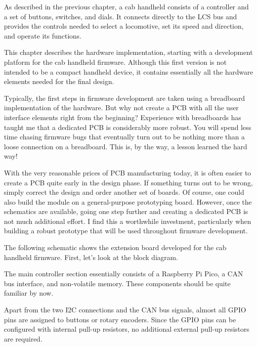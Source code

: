 
As described in the previous chapter, a cab handheld consists of a controller and a set of buttons, switches, and dials. It connects directly to the LCS bus and provides the controls needed to select a locomotive, set its speed and direction, and operate its functions.

This chapter describes the hardware implementation, starting with a development platform for the cab handheld firmware. Although this first version is not intended to be a compact handheld device, it contains essentially all the hardware elements needed for the final design.


Typically, the first steps in firmware development are taken using a breadboard implementation of the hardware. But why not create a PCB with all the user interface elements right from the beginning?
Experience with breadboards has taught me that a dedicated PCB is considerably more robust. You will spend less time chasing firmware bugs that eventually turn out to be nothing more than a loose connection on a breadboard. This is, by the way, a lesson learned the hard way!

With the very reasonable prices of PCB manufacturing today, it is often easier to create a PCB quite early in the design phase. If something turns out to be wrong, simply correct the design and order another set of boards. Of course, one could also build the module on a general-purpose prototyping board. However, once the schematics are available, going one step further and creating a dedicated PCB is not much additional effort.
I find this a worthwhile investment, particularly when building a robust prototype that will be used throughout firmware development.

The following schematic shows the extension board developed for the cab handheld firmware. First, let’s look at the block diagram.


The main controller section essentially consists of a Raspberry Pi Pico, a CAN bus interface, and non-volatile memory. These components should be quite familiar by now.

Apart from the two I2C connections and the CAN bus signals, almost all GPIO pins are assigned to buttons or rotary encoders. Since the GPIO pins can be configured with internal pull-up resistors, no additional external pull-up resistors are required.

